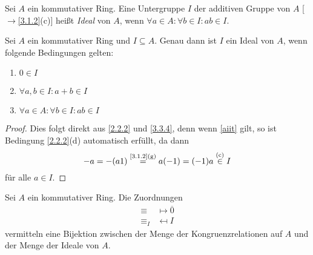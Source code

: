 \documentclass[../../main.tex]{subfiles}
\begin{document}
\begin{df}\label{3.3.4}
Sei $A$ ein kommutativer Ring. Eine Untergruppe $I$ der additiven Gruppe von $A$ [$\to$\ref{3.1.2}(c)] heißt \emph{Ideal} von $A$, wenn $\forall a\in A:\forall b\in I:ab\in I$.
\end{df}

\begin{pro}\label{3.3.5}
Sei $A$ ein kommutativer Ring und $I\subseteq A$. Genau dann ist $I$ ein Ideal von $A$, wenn folgende Bedingungen gelten:
\begin{enumerate}[\rm(a)]
\item $0\in I$
\item $\forall a,b\in I:a+b\in I$
\item $\forall a\in A:\forall b\in I:ab\in I$\label{aiit}
\end{enumerate}
\end{pro}
\begin{proof}
Dies folgt direkt aus \ref{2.2.2} und \ref{3.3.4}, denn wenn \eqref{aiit} gilt, so ist Bedingung \ref{2.2.2}(d) automatisch erfüllt, da dann
$$-a=-(a1)\overset{\text{\ref{3.1.2}(g)}}=a(-1)=(-1)a\overset{\text{(c)}}\in I$$
für alle $a\in I$.
\end{proof}

\begin{sat}\text{\rm[$\to$\ref{2.3.6}]} \label{3.3.6} Sei $A$ ein kommutativer Ring. Die Zuordnungen
\begin{align*}
\equiv&\mapsto\overline0\\
\equiv_I&\mapsfrom I
\end{align*}
vermitteln eine Bijektion zwischen der Menge der Kongruenzrelationen auf $A$ und der Menge der Ideale von $A$.
\end{sat}
\end{document}
